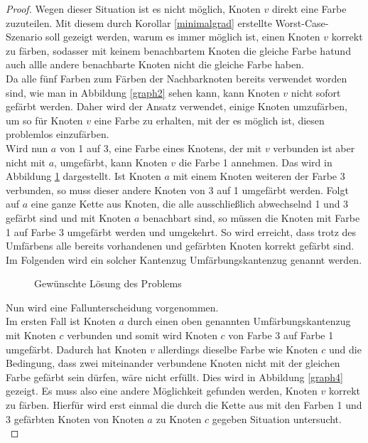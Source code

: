 \begin{proof}
Wegen dieser Situation ist es nicht möglich, Knoten $v$ direkt eine Farbe zuzuteilen. Mit diesem durch Korollar \ref{minimalgrad} erstellte Worst-Case-Szenario soll gezeigt werden, warum es immer möglich ist, einen Knoten $v$ korrekt zu färben, sodasser mit keinem benachbartem Knoten die gleiche Farbe hatund auch allle andere benachbarte Knoten nicht die gleiche Farbe haben.\\
Da alle fünf Farben zum Färben der Nachbarknoten bereits verwendet worden sind, wie man in Abbildung \ref{graph2} sehen kann, kann Knoten $v$ nicht sofort gefärbt werden. Daher wird der Ansatz verwendet, einige Knoten umzufärben, um so für Knoten $v$ eine Farbe zu erhalten, mit der es möglich ist, diesen problemlos einzufärben.\\
Wird nun $a$ von 1 auf 3, eine Farbe eines Knotens, der mit $v$ verbunden ist aber nicht mit $a$, umgefärbt, kann Knoten $v$ die Farbe 1 annehmen. Das wird in Abbildung \ref{graph3} dargestellt.
Ist Knoten $a$ mit einem Knoten weiteren der Farbe 3 verbunden, so muss dieser andere Knoten von 3 auf 1 umgefärbt werden. Folgt auf $a$ eine ganze Kette aus Knoten, die alle ausschließlich abwechselnd 1 und 3 gefärbt sind und mit Knoten $a$ benachbart sind, so müssen die Knoten mit Farbe 1 auf Farbe 3 umgefärbt werden und umgekehrt. So wird erreicht, dass trotz des Umfärbens alle bereits vorhandenen und gefärbten Knoten korrekt gefärbt sind. Im Folgenden wird ein solcher Kantenzug Umfärbungskantenzug genannt werden.\\
\begin{figure}
\centering
{}
\caption{Gewünschte Lösung des Problems}
\label{graph3}
\end{figure}
Nun wird eine Fallunterscheidung vorgenommen.\\
Im ersten Fall ist Knoten $a$ durch einen oben genannten Umfärbungskantenzug mit Knoten $c$ verbunden und somit wird Knoten $c$ von Farbe 3 auf Farbe 1 umgefärbt. Dadurch hat Knoten $v$ allerdings dieselbe Farbe wie Knoten $c$ und die Bedingung, dass zwei miteinander verbundene Knoten nicht mit der gleichen Farbe gefärbt sein dürfen, wäre nicht erfüllt. Dies wird in Abbildung \ref{graph4} gezeigt. Es muss also eine andere Möglichkeit gefunden werden, Knoten $v$ korrekt zu färben. Hierfür wird erst einmal die durch die Kette aus mit den Farben 1 und 3 gefärbten Knoten von Knoten $a$ zu Knoten $c$ gegeben Situation untersucht.\\

\end{proof}
